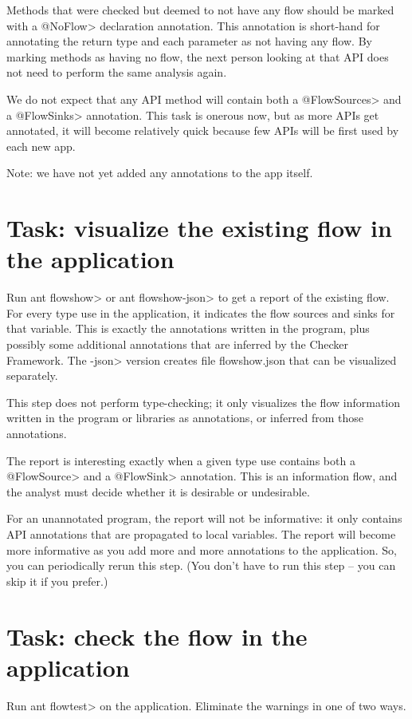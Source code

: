 Methods that were checked but deemed to not have any flow should
be marked with a \<@NoFlow> declaration annotation.
This annotation is short-hand for annotating the return type and each
parameter as not having any flow.
By marking methods as having no flow, the next person looking at that
API does not need to perform the same analysis again.

We do not expect that any API method will contain both a \<@FlowSources>
and a \<@FlowSinks> annotation.
This task is onerous now, but as more APIs get annotated, it will
become relatively quick because few APIs will be first used by each
new app.

Note: we have not yet added any annotations to the app itself.


\section{Task: visualize the existing flow in the application}

Run \<ant flowshow> or \<ant flowshow-json> to get a report of the
existing flow.
For every type use in the application, it indicates the flow sources
and sinks for that variable. This is exactly the annotations written
in the program, plus possibly some additional annotations that are
inferred by the Checker Framework.
The \<-json> version creates file flowshow.json that can be visualized
separately.

This step does not perform type-checking; it only visualizes the flow
information written in the program or libraries as annotations, or
inferred from those annotations.

The report is interesting exactly when a given type use contains both
a \<@FlowSource> and a \<@FlowSink> annotation. This is an information flow,
and the analyst must decide whether it is desirable or undesirable.

For an unannotated program, the report will not be informative: it
only contains API annotations that are propagated to local
variables. The report will become more informative as you add more and
more annotations to the application. So, you can periodically rerun
this step. (You don't have to run this step -- you can skip it if you
prefer.)


\section{Task: check the flow in the application}

Run \<ant flowtest> on the application.
Eliminate the warnings in one of two ways.

